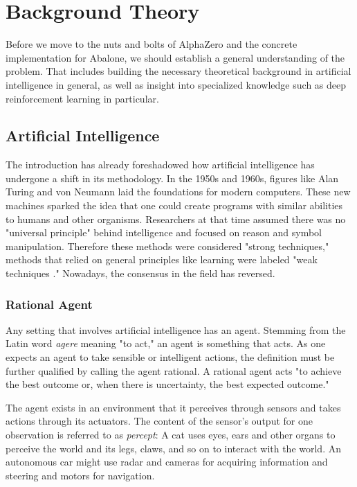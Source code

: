 \chapter{Background Theory}
\label{background-theory}
Before we move to the nuts and bolts of AlphaZero and the concrete implementation for Abalone, we should establish a general understanding of the problem. That includes building the necessary theoretical background in artificial intelligence in general, as well as insight into specialized knowledge such as deep reinforcement learning in particular.

\section{Artificial Intelligence}
The introduction has already foreshadowed how artificial intelligence has undergone a shift in its methodology. In the 1950s and 1960s, figures like Alan Turing and von Neumann laid the foundations for modern computers. These new machines sparked the idea that one could create programs with similar abilities to humans and other organisms. Researchers at that time assumed there was no "universal principle" behind intelligence and focused on reason and symbol manipulation. Therefore these methods were considered "strong techniques," methods that relied on general principles like learning were labeled "weak techniques ." Nowadays, the consensus in the field has reversed. \cite[cf. p. 8f.]{sutton_reinforcement_2018}


\subsection{Rational Agent}
Any setting that involves artificial intelligence has an agent. Stemming from the Latin word \textit{agere} meaning "to act," an agent is something that acts. As one expects an agent to take sensible or intelligent actions, the definition must be further qualified by calling the agent rational. A rational agent acts "to achieve the best outcome or, when there is uncertainty, the best expected outcome." \cite[p. 36]{russell_artificial_2021}

The agent exists in an environment that it perceives through sensors and takes actions through its actuators. The content of the sensor's output for one observation is referred to as \textit{percept}: A cat uses eyes, ears and other organs to perceive the world and its legs, claws, and so on to interact with the world. An autonomous car might use radar and cameras for acquiring information and steering and motors for navigation.

